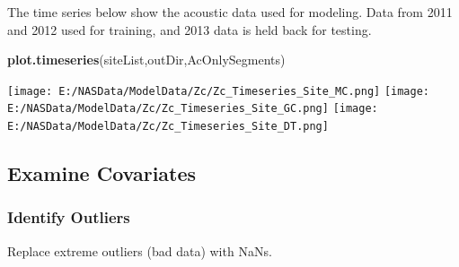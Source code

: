 \documentclass[11pt,]{article}
\newenvironment{Shaded}{\begin{snugshade}}{\end{snugshade}}
\newcommand{\KeywordTok}[1]{\textcolor[rgb]{0.13,0.29,0.53}{\textbf{{#1}}}}
\newcommand{\NormalTok}[1]{{#1}}
\begin{document}
\hypertarget{htmlwidget-8022b3dea3d6af5c88bf}{}

The time series below show the acoustic data used for modeling. Data
from 2011 and 2012 used for training, and 2013 data is held back for
testing.

\begin{Shaded}
\begin{Highlighting}[]
\KeywordTok{plot.timeseries}\NormalTok{(siteList,outDir,AcOnlySegments)}
\end{Highlighting}
\end{Shaded}

\texttt{[image: E:/NASData/ModelData/Zc/Zc\_Timeseries\_Site\_MC.png]}
\texttt{[image: E:/NASData/ModelData/Zc/Zc\_Timeseries\_Site\_GC.png]}
\texttt{[image: E:/NASData/ModelData/Zc/Zc\_Timeseries\_Site\_DT.png]}

\subsection{Examine Covariates}\label{examine-covariates}

\subsubsection{Identify Outliers}\label{identify-outliers}

Replace extreme outliers (bad data) with NaNs.
\end{document}
